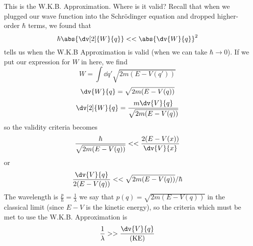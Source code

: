 \documentclass[a4paper,twoside,master.tex]{subfiles}
\begin{document}
This is the W.K.B. Approximation. Where is it valid? Recall that when we plugged our wave function into the Schr\"odinger equation and dropped higher-order $ \hbar $ terms, we found that
\begin{equation}
    \hbar \abs{\dv[2]{W}{q}} << \abs{\dv{W}{q}}^2
\end{equation}
tells us when the W.K.B Approximation is valid (when we can take $ \hbar \to 0 $). If we put our expression for $ W $ in here, we find
\begin{equation}
    W = \int \dd{q'} \sqrt{2m(E-V(q'))}
\end{equation}
\begin{equation}
    \dv{W}{q} = \sqrt{2m(E-V(q))}
\end{equation}
\begin{equation}
    \dv[2]{W}{q} = \frac{m \dv{V}{q}}{\sqrt{2m(E-V(q))}}
\end{equation}
so the validity criteria becomes
\begin{equation}
    \frac{\hbar}{\sqrt{2m(E-V(q))}} << \frac{2(E-V(x))}{\dv{V}{x}} 
\end{equation}
or
\begin{equation}
    \frac{\dv{V}{q}}{2(E-V(q))} << \sqrt{2m(E-V(q))} / \hbar
\end{equation}
The wavelength is $ \frac{p}{\hbar} = \frac{1}{\lambda} $ we say that $ p(q) = \sqrt{2m (E-V(q))} $ in the classical limit (since $ E-V $ is the kinetic energy), so the criteria which must be met to use the W.K.B. Approximation is
\begin{equation}
    \frac{1}{\lambda} >> \frac{\dv{V}{q}}{(\text{KE})}
\end{equation}
\end{document}
